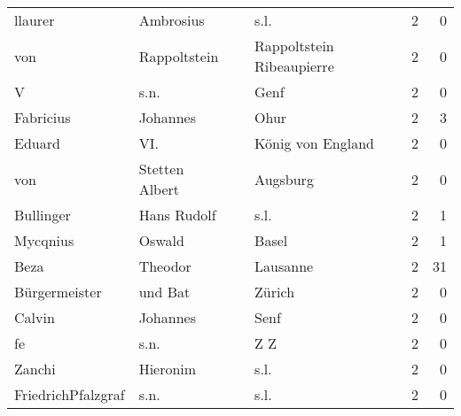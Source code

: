 \begin{tabular}{llllrr}
                  llaurer &                          Ambrosius &             &                                        s.l. &          2 &         0 \\
                      von &                       Rappoltstein &             &                   Rappoltstein Ribeaupierre &          2 &         0 \\
                        V &                               s.n. &             &                                        Genf &          2 &         0 \\
                Fabricius &                           Johannes &             &                                        Ohur &          2 &         3 \\
                   Eduard &                                VI. &             &                           König von England &          2 &         0 \\
                      von &                     Stetten Albert &             &                                    Augsburg &          2 &         0 \\
                Bullinger &                        Hans Rudolf &             &                                        s.l. &          2 &         1 \\
                 Mycqnius &                             Oswald &             &                                       Basel &          2 &         1 \\
                     Beza &                            Theodor &             &                                    Lausanne &          2 &        31 \\
            Bürgermeister &                            und Bat &             &                                      Zürich &          2 &         0 \\
                   Calvin &                           Johannes &             &                                        Senf &          2 &         0 \\
                       fe &                               s.n. &             &                                         Z Z &          2 &         0 \\
                   Zanchi &                           Hieronim &             &                                        s.l. &          2 &         0 \\
       FriedrichPfalzgraf &                               s.n. &             &                                        s.l. &          2 &         0 \\

\end{tabular}
